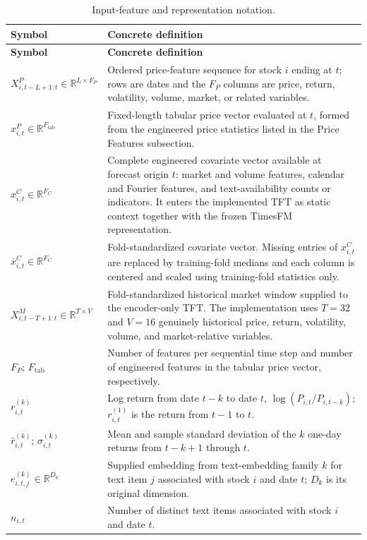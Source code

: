 \documentclass[11pt]{article}
\newcommand{\R}{\mathbb{R}}
\begin{document}
{\begin{longtable}{@{}p{}p{}@{}}
\caption{Input-feature and representation notation.}
\label{tab:notation-inputs}\\
\toprule
\textbf{Symbol} & \textbf{Concrete definition} \\
\midrule
\endfirsthead
\toprule
\textbf{Symbol} & \textbf{Concrete definition} \\
\midrule
\endhead
$X^P_{i,t-L+1:t}\in\R^{L\times F_P}$ & Ordered price-feature sequence for stock $i$ ending at $t$; rows are dates and the $F_P$ columns are price, return, volatility, volume, market, or related variables. \\
$x^P_{i,t}\in\R^{F_{\mathrm{tab}}}$ & Fixed-length tabular price vector evaluated at $t$, formed from the engineered price statistics listed in the Price Features subsection. \\
$x^C_{i,t}\in\R^{F_C}$ & Complete engineered covariate vector available at forecast origin $t$: market and volume features, calendar and Fourier features, and text-availability counts or indicators. It enters the implemented TFT as static context together with the frozen TimesFM representation. \\
$\bar x^C_{i,t}\in\R^{F_C}$ & Fold-standardized covariate vector. Missing entries of $x^C_{i,t}$ are replaced by training-fold medians and each column is centered and scaled using training-fold statistics only. \\
$X^M_{i,t-T+1:t}\in\R^{T\times V}$ & Fold-standardized historical market window supplied to the encoder-only TFT. The implementation uses $T=32$ and $V=16$ genuinely historical price, return, volatility, volume, and market-relative variables. \\
$F_P$; $F_{\mathrm{tab}}$ & Number of features per sequential time step and number of engineered features in the tabular price vector, respectively. \\
$r_{i,t}^{(k)}$ & Log return from date $t-k$ to date $t$, $\log(P_{i,t}/P_{i,t-k})$; $r_{i,t}^{(1)}$ is the return from $t-1$ to $t$. \\
$\bar r_{i,t}^{(k)}$; $\sigma_{i,t}^{(k)}$ & Mean and sample standard deviation of the $k$ one-day returns from $t-k+1$ through $t$. \\
$e^{(k)}_{i,t,j}\in\R^{D_k}$ & Supplied embedding from text-embedding family $k$ for text item $j$ associated with stock $i$ and date $t$; $D_k$ is its original dimension. \\
$n_{i,t}$ & Number of distinct text items associated with stock $i$ and date $t$. \\

\end{longtable}}
\end{document}
